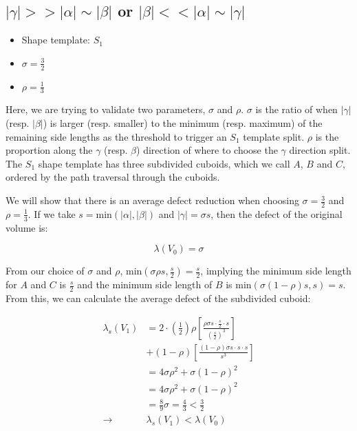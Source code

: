 
\subsection{$|\gamma| >> |\alpha| \sim |\beta|$ or $|\beta| << |\alpha| \sim |\gamma|$}

\begin{itemize}
  \item Shape template: $S_1$
  \item $\sigma = \frac{3}{2}$
  \item $\rho = \frac{1}{3}$
\end{itemize}

Here, we are trying to validate two parameters, $\sigma$ and $\rho$.
$\sigma$ is the ratio of when $|\gamma|$ (resp. $|\beta|$)
is larger (resp. smaller) to the minimum (resp. maximum) of the remaining side lengths as the threshold to trigger an $S_1$
template split.
$\rho$ is the proportion along the $\gamma$ (resp. $\beta$) direction of where to choose the $\gamma$ direction split.
The $S_1$ shape template has three subdivided cuboids, which we call $A$, $B$ and $C$, ordered by
the path traversal through the cuboids.

We will show that there is an average defect reduction when choosing $\sigma = \frac{3}{2}$ and
$\rho = \frac{1}{3}$.
If we take $s = \text{min}(|\alpha|, |\beta|)$ and $|\gamma| = \sigma s$, then the defect of the original volume is:

$$
\lambda(V_0) = \sigma
$$

From our choice of $\sigma$ and $\rho$, $\text{min}( \sigma \rho s, \frac{s}{2} ) = \frac{s}{2}$,
implying the minimum side length for $A$ and $C$ is $\frac{s}{2}$ and the minimum side length of $B$
is $\text{min}( \sigma (1-\rho) s, s) = s$.
From this, we can calculate the average defect of the subdivided cuboid:

$$
\begin{array}{ll}
  \lambda_s (V_1) & = 2 \cdot (\frac{1}{2}) \rho [ \frac{ \rho \sigma s \cdot \frac{s}{2} \cdot s }{ (\frac{s}{2})^3 } ] \\
        & + (1-\rho) [ \frac{ (1-\rho) \sigma s \cdot s \cdot s }{s^3} ] \\
   & = 4 \sigma \rho^2 + \sigma (1-\rho)^2 \\
  & = 4 \sigma \rho^2 + \sigma (1-\rho)^2 \\
  & = \frac{8}{9} \sigma = \frac{4}{3} < \frac{3}{2} \\
  \to & \lambda_s(V_1) < \lambda(V_0)
\end{array}
$$

